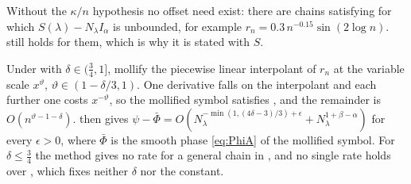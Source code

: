 \begin{remark}\label{rem:nooffset}
Without the $\kappa/n$ hypothesis no offset need exist: there are chains satisfying
 for which $S(\lambda)-N_\lambda I_\alpha$ is unbounded, for example
$r_n=0.3\,n^{-0.15}\sin(2\log n)$.  still holds for them, which is
why it is stated with $S$.
\end{remark}

\begin{remark}\label{rem:mollify}
Under  with $\delta\in(\frac34,1]$, mollify the piecewise linear interpolant of
$r_n$ at the variable scale $x^\vartheta$, $\vartheta\in(1-\delta/3,1)$. One derivative falls on the
interpolant and each further one costs $x^{-\vartheta}$, so the mollified symbol satisfies
, and the remainder is $O(n^{\vartheta-1-\delta})$.  then gives
$\psi-\bar\Phi=O(N_\lambda^{-\min(1,(4\delta-3)/3)+\epsilon}+N_\lambda^{1+\beta-\alpha})$ for every
$\epsilon>0$, where $\bar\Phi$ is the smooth phase \eqref{eq:PhiA} of the mollified symbol. For
$\delta\le\frac34$ the method gives no rate for a general chain in , and no single rate
holds over , which fixes neither $\delta$ nor the constant.
\end{remark}
